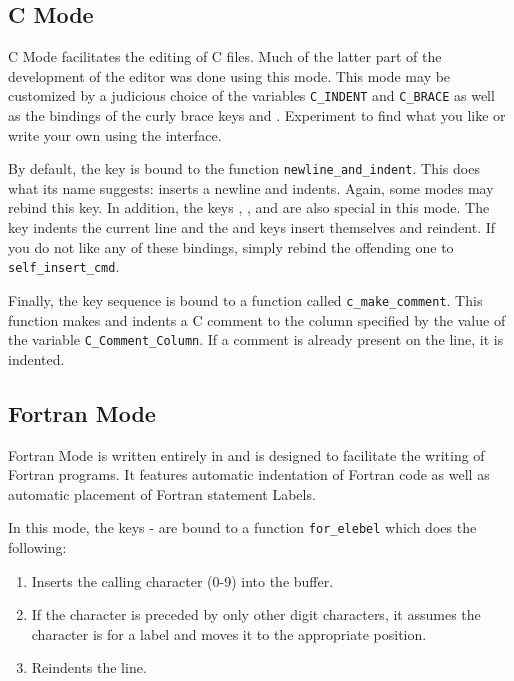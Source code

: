 \subsection{C Mode}

  C Mode facilitates the editing of C files.  Much of the latter part of the
  development of the \jed{} editor was done using this mode.  This mode may be
  customized by a judicious choice of the variables \verb|C_INDENT| and
  \verb|C_BRACE| as well as the bindings of the curly brace keys \var{\{} 
  and \key{\}}.  Experiment to find what you like or write your own using the
  \slang{} interface.

  By default, the  key is bound to the function
  \verb|newline_and_indent|. This does what its name suggests: inserts a
  newline and indents.  Again, some modes may rebind this key.  In addition,
  the keys \var{\{}, \var{\}}, and  are also special in this mode.
  The  key indents the current line and the \var{\{} and \var{\}}
  keys insert themselves and reindent.  If you do not like any of these
  bindings, simply rebind the offending one to \verb|self_insert_cmd|.

  Finally, the key sequence  is bound to a function called
  \verb|c_make_comment|.  This function makes and indents a C comment to the
  column specified by the value of the variable \verb|C_Comment_Column|.  If
  a comment is already present on the line, it is indented.

\subsection{Fortran Mode}

  Fortran Mode is written entirely in \slang{} and is designed to facilitate
  the writing of Fortran programs.  It features automatic indentation of
  Fortran code as well as automatic placement of Fortran statement Labels.

  In this mode, the keys - are bound to a function
  \verb|for_elebel| which does the following:
\begin{enumerate}
\item Inserts the calling character (0-9) into the buffer.

\item If the character is preceded by only other digit characters, it
      assumes the character is for a label and moves it to the appropriate
      position.

\item Reindents the line.
\end{enumerate}

